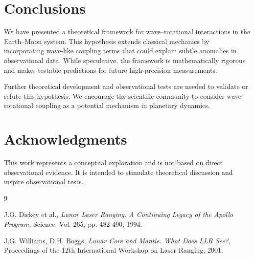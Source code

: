 \documentclass[12pt,a4paper]{article}
\begin{document}
\section{Conclusions}

We have presented a theoretical framework for wave–rotational interactions in the Earth–Moon system. This hypothesis extends classical mechanics by incorporating wave-like coupling terms that could explain subtle anomalies in observational data. While speculative, the framework is mathematically rigorous and makes testable predictions for future high-precision measurements.

Further theoretical development and observational tests are needed to validate or refute this hypothesis. We encourage the scientific community to consider wave–rotational coupling as a potential mechanism in planetary dynamics.

\section*{Acknowledgments}

This work represents a conceptual exploration and is not based on direct observational evidence. It is intended to stimulate theoretical discussion and inspire observational tests.

\begin{thebibliography}{9}

J.O. Dickey et al., 
\textit{Lunar Laser Ranging: A Continuing Legacy of the Apollo Program},
Science, Vol. 265, pp. 482-490, 1994.

J.G. Williams, D.H. Boggs,
\textit{Lunar Core and Mantle. What Does LLR See?},
Proceedings of the 12th International Workshop on Laser Ranging, 2001.

\end{thebibliography}
\end{document}
